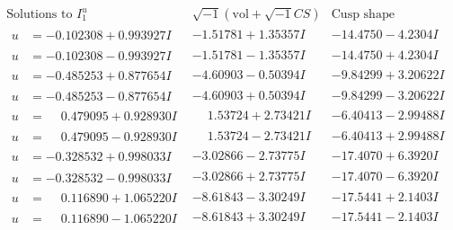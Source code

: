 \documentclass[1p]{elsarticle_modified}
\theoremstyle{definition}
\newcommand{\I}{\sqrt{-1}}
\begin{document}
$$\begin{array}{c|c|c}  
\text{Solutions to }I^u_{1}& \I (\text{vol} + \sqrt{-1}CS) & \text{Cusp shape}\\
 \hline 
\begin{aligned}
u &= -0.102308 + 0.993927 I\end{aligned}
 & -1.51781 + 1.35357 I & -14.4750 - 4.2304 I \\ \hline\begin{aligned}
u &= -0.102308 - 0.993927 I\end{aligned}
 & -1.51781 - 1.35357 I & -14.4750 + 4.2304 I \\ \hline\begin{aligned}
u &= -0.485253 + 0.877654 I\end{aligned}
 & -4.60903 - 0.50394 I & -9.84299 + 3.20622 I \\ \hline\begin{aligned}
u &= -0.485253 - 0.877654 I\end{aligned}
 & -4.60903 + 0.50394 I & -9.84299 - 3.20622 I \\ \hline\begin{aligned}
u &= \phantom{-}0.479095 + 0.928930 I\end{aligned}
 & \phantom{-}1.53724 + 2.73421 I & -6.40413 - 2.99488 I \\ \hline\begin{aligned}
u &= \phantom{-}0.479095 - 0.928930 I\end{aligned}
 & \phantom{-}1.53724 - 2.73421 I & -6.40413 + 2.99488 I \\ \hline\begin{aligned}
u &= -0.328532 + 0.998033 I\end{aligned}
 & -3.02866 - 2.73775 I & -17.4070 + 6.3920 I \\ \hline\begin{aligned}
u &= -0.328532 - 0.998033 I\end{aligned}
 & -3.02866 + 2.73775 I & -17.4070 - 6.3920 I \\ \hline\begin{aligned}
u &= \phantom{-}0.116890 + 1.065220 I\end{aligned}
 & -8.61843 - 3.30249 I & -17.5441 + 2.1403 I \\ \hline\begin{aligned}
u &= \phantom{-}0.116890 - 1.065220 I\end{aligned}
 & -8.61843 + 3.30249 I & -17.5441 - 2.1403 I \\ \hline\begin{aligned}

\end{aligned}
\end{array}$$
\end{document}
